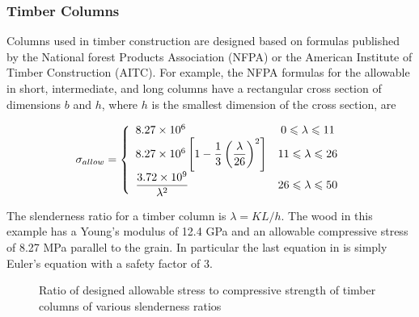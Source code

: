 \documentclass[
10pt,
a4paper,
openany,
svgnames,
]{book}
\begin{document}
\subsubsection{Timber Columns}

Columns used in timber construction are designed based on formulas published by the National forest Products Association (NFPA) or the American Institute of Timber Construction (AITC). For example, the NFPA formulas for the allowable in short, intermediate, and long columns have a rectangular cross section of dimensions $b$ and $h$, where $h$ is the smallest dimension of the cross section, are

\begin{equation}
  \sigma_{allow} = \left\{
    \begin{array}{l c}
      8.27 \times 10^6 & 0 \leqslant \lambda \leqslant 11 \\ 
      8.27 \times 10^6\left[ 1 - \dfrac{1}{3} \left( \dfrac{\lambda}{26} \right)^2 \right] & 11 \leqslant \lambda \leqslant 26 \\ 
      \dfrac{3.72 \times 10^9}{\lambda^2} & 26 \leqslant \lambda \leqslant 50 
    \end{array} \right.
\end{equation}

The slenderness ratio for a timber column is $\lambda = KL/h$. The wood in this example has a Young’s modulus of 12.4 GPa and an allowable compressive stress of 8.27 MPa parallel to the grain. In particular the last equation in is simply Euler’s equation with a safety factor of 3.

\begin{figure}[h]
  \centering
  \caption{Ratio of designed allowable stress to compressive strength of timber columns of various slenderness ratios}
  \label{fig: timber columns}
\end{figure}
\end{document}

